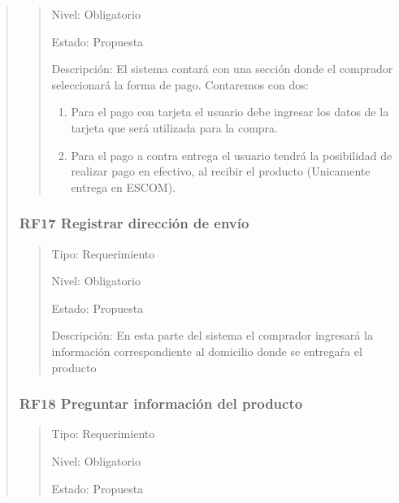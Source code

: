 \documentclass[14pt]{article}
\begin{document}
\begin{quote}
\begin{quote}
                        Nivel: Obligatorio
                        
                        Estado: Propuesta
                        
                        Descripción: El sistema contará con una sección donde el comprador seleccionará la forma de pago. Contaremos con dos:
    
                        \begin{enumerate}
                            \item Para el pago con tarjeta el usuario debe ingresar los datos de la tarjeta que será utilizada para la compra.
                            
                            \item Para el pago a contra entrega el usuario tendrá la posibilidad de realizar pago en efectivo, al recibir el producto (Unicamente entrega en ESCOM).
                        \end{enumerate}
                    \end{quote}
                \subsubsection{RF17 Registrar dirección de envío}\label{RF17 Registrar dirección de envío}
                    \begin{quote}
                        Tipo: Requerimiento
                        
                        Nivel: Obligatorio
                        
                        Estado: Propuesta
                        
                        Descripción: En esta parte del sistema el comprador ingresará la información correspondiente al domicilio donde se entregaŕa el producto
                    \end{quote}
                \subsubsection{RF18 Preguntar información del producto}\label{RF18 Preguntar información del producto}
                    \begin{quote}
                        Tipo: Requerimiento
                        
                        Nivel: Obligatorio
                        
                        Estado: Propuesta
                        

\end{quote}
\end{quote}
\end{document}
